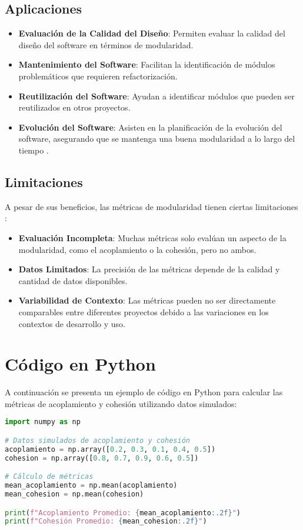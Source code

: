 \documentclass[a4,10pt]{article}
\begin{document}
\subsection{Aplicaciones}
\begin{itemize}
    \item \textbf{Evaluación de la Calidad del Diseño}: Permiten evaluar la calidad del diseño del software en términos de modularidad.
    \item \textbf{Mantenimiento del Software}: Facilitan la identificación de módulos problemáticos que requieren refactorización.
    \item \textbf{Reutilización del Software}: Ayudan a identificar módulos que pueden ser reutilizados en otros proyectos.
    \item \textbf{Evolución del Software}: Asisten en la planificación de la evolución del software, asegurando que se mantenga una buena modularidad a lo largo del tiempo \cite{xiang2019}.
\end{itemize}

\subsection{Limitaciones}
A pesar de sus beneficios, las métricas de modularidad tienen ciertas limitaciones \cite{rahardjo2011}:
\begin{itemize}
    \item \textbf{Evaluación Incompleta}: Muchas métricas solo evalúan un aspecto de la modularidad, como el acoplamiento o la cohesión, pero no ambos.
    \item \textbf{Datos Limitados}: La precisión de las métricas depende de la calidad y cantidad de datos disponibles.
    \item \textbf{Variabilidad de Contexto}: Las métricas pueden no ser directamente comparables entre diferentes proyectos debido a las variaciones en los contextos de desarrollo y uso.
\end{itemize}

\section{Código en Python}
A continuación se presenta un ejemplo de código en Python para calcular las métricas de acoplamiento y cohesión utilizando datos simulados:

\begin{lstlisting}[language=Python, caption=Cálculo de Métricas de Modularidad en Python]
import numpy as np

# Datos simulados de acoplamiento y cohesión
acoplamiento = np.array([0.2, 0.3, 0.1, 0.4, 0.5])
cohesion = np.array([0.8, 0.7, 0.9, 0.6, 0.5])

# Cálculo de métricas
mean_acoplamiento = np.mean(acoplamiento)
mean_cohesion = np.mean(cohesion)

print(f"Acoplamiento Promedio: {mean_acoplamiento:.2f}")
print(f"Cohesión Promedio: {mean_cohesion:.2f}")
\end{lstlisting}
\end{document}
